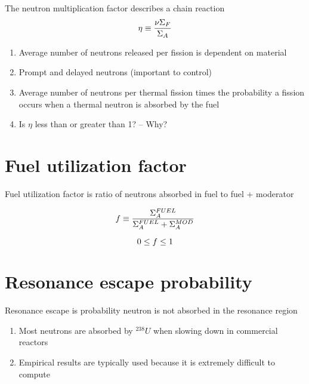 \documentclass[aspectratio=1610,pdftex,dvipsnames,compress,xcolor={dvipsnames}]{beamer}
\begin{document}
\addtocounter{framenumber}{-3} 
\begin{frame}{The neutron multiplication factor describes a chain reaction}
    \begin{equation}
        \LARGE
        \eta \equiv \frac{\nu \Sigma_F}{\Sigma_A}
    \end{equation}

    \vspace*{\fill}

    \begin{enumerate}[series=outerlist,topsep=0pt,itemsep=21pt,leftmargin=*,label=(\arabic*)]
        \item[]Average number of neutrons released per fission is dependent on material
        \item[]Prompt and delayed neutrons (important to control)
        \item[]Average number of neutrons per thermal fission times the probability a fission occurs when a thermal neutron is absorbed by the fuel
        \item[]Is $\eta$ less than or greater than 1? -- Why?
    \end{enumerate}
\end{frame}


\section{Fuel utilization factor}


\addtocounter{framenumber}{-1} 
\begin{frame}{Fuel utilization factor is ratio of neutrons absorbed in fuel to fuel + moderator}

    \begin{equation}
        \LARGE
        f \equiv \frac{\Sigma^{FUEL}_A}{\Sigma^{FUEL}_A + \Sigma^{MOD}_A}
    \end{equation}

    \begin{equation}
        \LARGE
        0 \leq f \leq 1
    \end{equation}

\end{frame}


\section{Resonance escape probability}


\addtocounter{framenumber}{-1} 
\begin{frame}{Resonance escape is probability neutron is not absorbed in the resonance region}
    \begin{enumerate}[series=outerlist,topsep=0pt,itemsep=21pt,leftmargin=*,label=(\arabic*)]
        \item[]Most neutrons are absorbed by $^{238}U$ when slowing down in commercial reactors
        \item[]Empirical results are typically used because it is extremely difficult to compute
    \end{enumerate}
\end{frame}
\end{document}

